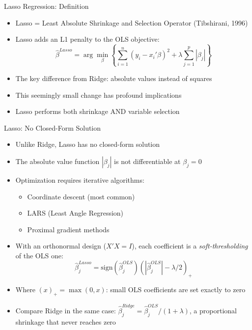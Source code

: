 \documentclass[aspectratio=169]{beamer}
\begin{document}
\begin{frame}{Lasso Regression: Definition}
\begin{itemize}
    \item Lasso = Least Absolute Shrinkage and Selection Operator (Tibshirani, 1996)
    \item Lasso adds an L1 penalty to the OLS objective:
    \[\hat{\beta}^{Lasso} = \arg\min_{\beta} \left\{ \sum_{i=1}^{n}(y_i - x_i'\beta)^2 + \lambda \sum_{j=1}^{p}|\beta_j| \right\}\]
    \item The key difference from Ridge: absolute values instead of squares
    \item This seemingly small change has profound implications
    \item Lasso performs both shrinkage AND variable selection
\end{itemize}
\end{frame}

\begin{frame}{Lasso: No Closed-Form Solution}
\begin{itemize}
    \item Unlike Ridge, Lasso has no closed-form solution
    \item The absolute value function $|\beta_j|$ is not differentiable at $\beta_j = 0$
    \item Optimization requires iterative algorithms:
    \begin{itemize}
        \item Coordinate descent (most common)
        \item LARS (Least Angle Regression)
        \item Proximal gradient methods
    \end{itemize}
    \item With an orthonormal design ($X'X = I$), each coefficient is a \textit{soft-thresholding} of the OLS one:
    \[\hat{\beta}_j^{Lasso} = \text{sign}(\hat{\beta}_j^{OLS})\left(|\hat{\beta}_j^{OLS}| - \lambda/2\right)_+\]
    \item Where $(x)_+ = \max(0, x)$: small OLS coefficients are set exactly to zero
    \item Compare Ridge in the same case: $\hat{\beta}_j^{Ridge} = \hat{\beta}_j^{OLS}/(1 + \lambda)$, a proportional shrinkage that never reaches zero
\end{itemize}
\end{frame}
\end{document}
